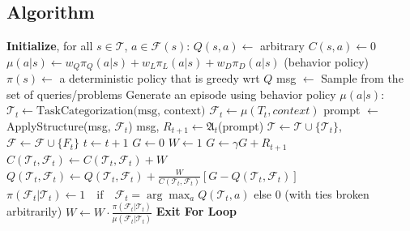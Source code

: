 \subsection{Algorithm}
\begin{algorithm}[h]
\caption{\method Algorithm}
\label{appendix:offpolicy_mc}
\begin{algorithmic}[1]
\STATE \textbf{Initialize}, for all $s \in \mathcal{T}$, $a \in \mathcal{F}(s)$:
\STATE \quad $Q(s,a) \leftarrow$ arbitrary
\STATE \quad $C(s,a) \leftarrow 0$
\STATE \quad $\mu(a|s) \leftarrow w_Q \pi_Q(a|s) + w_L \pi_L(a|s) + w_D \pi_D(a|s)$ (behavior policy)
\STATE \quad $\pi(s) \leftarrow$ a deterministic policy that is greedy wrt $Q$
\REPEAT
    \STATE msg $\leftarrow$ Sample from the set of queries/problems
    \STATE Generate an episode using behavior policy $\mu(a|s)$:
        \REPEAT 
            \STATE $\mathcal{T}_{t} \leftarrow \text{TaskCategorization(msg, context)}$
            \STATE $\mathcal{F}_t \leftarrow \mu(T_{t}, context)$
            \STATE prompt $\leftarrow$ ApplyStructure(msg, $\mathcal{F}_t$)
            \STATE msg, $R_{t+1} \leftarrow \mathfrak{A}_t$(prompt)
                \STATE $\mathcal{T} \leftarrow \mathcal{T} \cup \{\mathcal{T}_{t}\}$, $\mathcal{F} \leftarrow \mathcal{F} \cup \{F_t\}$
            \ENDIF
            \STATE $t \leftarrow t+1$
    \STATE $G \leftarrow 0$
    \STATE $W \leftarrow 1$
        \STATE $G \leftarrow \gamma G + R_{t+1}$
        \STATE $C(\mathcal{T}_t, \mathcal{F}_t) \leftarrow C(\mathcal{T}_t, \mathcal{F}_t) + W$
        \STATE $Q(\mathcal{T}_t, \mathcal{F}_t) \leftarrow Q(\mathcal{T}_t, \mathcal{F}_t) + \frac{W}{C(\mathcal{T}_t, \mathcal{F}_t)}[G - Q(\mathcal{T}_t, \mathcal{F}_t)]$
        \STATE $\pi(\mathcal{F}_t|\mathcal{T}_t) \leftarrow 1 \quad \text{if} \quad  \mathcal{F}_t=\arg\max_a Q(\mathcal{T}_t, a)$ else 0 (with ties broken arbitrarily)
        \STATE $W \leftarrow W \cdot \frac{\pi(\mathcal{F}_t|\mathcal{T}_t)}{\mu(\mathcal{F}_t|\mathcal{T}_t)}$
            \STATE \textbf{Exit For Loop}
        \ENDIF
    \ENDFOR
{}
\end{algorithmic}
\end{algorithm}



